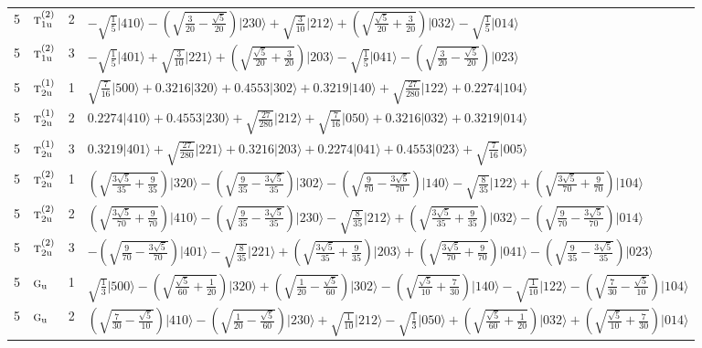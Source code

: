 \documentclass[11pt]{article}
\newcommand{\irr}[1]{\text{\normalfont\scshape #1}}
\newcommand{\ptag}[1]{\mathrm{#1}}
\newcommand{\occ}[1]{\lvert #1\rangle}
\begin{document}
\begin{longtable}{c l c p{}}
5 & $\irr{t}_{1\ptag{u}}^{(2)}$ & 2 & $-\sqrt{\tfrac{1}{5}}\occ{410}-(\sqrt{\frac{3}{20} - \frac{\sqrt{5}}{20}})\occ{230}+\sqrt{\tfrac{3}{10}}\occ{212}+(\sqrt{\frac{\sqrt{5}}{20} + \frac{3}{20}})\occ{032}-\sqrt{\tfrac{1}{5}}\occ{014}$\\
5 & $\irr{t}_{1\ptag{u}}^{(2)}$ & 3 & $-\sqrt{\tfrac{1}{5}}\occ{401}+\sqrt{\tfrac{3}{10}}\occ{221}+(\sqrt{\frac{\sqrt{5}}{20} + \frac{3}{20}})\occ{203}-\sqrt{\tfrac{1}{5}}\occ{041}-(\sqrt{\frac{3}{20} - \frac{\sqrt{5}}{20}})\occ{023}$\\
5 & $\irr{t}_{2\ptag{u}}^{(1)}$ & 1 & $\sqrt{\tfrac{7}{16}}\occ{500}+0.3216\occ{320}+0.4553\occ{302}+0.3219\occ{140}+\sqrt{\tfrac{27}{280}}\occ{122}+0.2274\occ{104}$\\
5 & $\irr{t}_{2\ptag{u}}^{(1)}$ & 2 & $0.2274\occ{410}+0.4553\occ{230}+\sqrt{\tfrac{27}{280}}\occ{212}+\sqrt{\tfrac{7}{16}}\occ{050}+0.3216\occ{032}+0.3219\occ{014}$\\
5 & $\irr{t}_{2\ptag{u}}^{(1)}$ & 3 & $0.3219\occ{401}+\sqrt{\tfrac{27}{280}}\occ{221}+0.3216\occ{203}+0.2274\occ{041}+0.4553\occ{023}+\sqrt{\tfrac{7}{16}}\occ{005}$\\
5 & $\irr{t}_{2\ptag{u}}^{(2)}$ & 1 & $(\sqrt{\frac{3 \sqrt{5}}{35} + \frac{9}{35}})\occ{320}-(\sqrt{\frac{9}{35} - \frac{3 \sqrt{5}}{35}})\occ{302}-(\sqrt{\frac{9}{70} - \frac{3 \sqrt{5}}{70}})\occ{140}-\sqrt{\tfrac{8}{35}}\occ{122}+(\sqrt{\frac{3 \sqrt{5}}{70} + \frac{9}{70}})\occ{104}$\\
5 & $\irr{t}_{2\ptag{u}}^{(2)}$ & 2 & $(\sqrt{\frac{3 \sqrt{5}}{70} + \frac{9}{70}})\occ{410}-(\sqrt{\frac{9}{35} - \frac{3 \sqrt{5}}{35}})\occ{230}-\sqrt{\tfrac{8}{35}}\occ{212}+(\sqrt{\frac{3 \sqrt{5}}{35} + \frac{9}{35}})\occ{032}-(\sqrt{\frac{9}{70} - \frac{3 \sqrt{5}}{70}})\occ{014}$\\
5 & $\irr{t}_{2\ptag{u}}^{(2)}$ & 3 & $-(\sqrt{\frac{9}{70} - \frac{3 \sqrt{5}}{70}})\occ{401}-\sqrt{\tfrac{8}{35}}\occ{221}+(\sqrt{\frac{3 \sqrt{5}}{35} + \frac{9}{35}})\occ{203}+(\sqrt{\frac{3 \sqrt{5}}{70} + \frac{9}{70}})\occ{041}-(\sqrt{\frac{9}{35} - \frac{3 \sqrt{5}}{35}})\occ{023}$\\
5 & $\irr{g}_{\ptag{u}}$ & 1 & $\sqrt{\tfrac{1}{3}}\occ{500}-(\sqrt{\frac{\sqrt{5}}{60} + \frac{1}{20}})\occ{320}+(\sqrt{\frac{1}{20} - \frac{\sqrt{5}}{60}})\occ{302}-(\sqrt{\frac{\sqrt{5}}{10} + \frac{7}{30}})\occ{140}-\sqrt{\tfrac{1}{10}}\occ{122}-(\sqrt{\frac{7}{30} - \frac{\sqrt{5}}{10}})\occ{104}$\\
5 & $\irr{g}_{\ptag{u}}$ & 2 & $(\sqrt{\frac{7}{30} - \frac{\sqrt{5}}{10}})\occ{410}-(\sqrt{\frac{1}{20} - \frac{\sqrt{5}}{60}})\occ{230}+\sqrt{\tfrac{1}{10}}\occ{212}-\sqrt{\tfrac{1}{3}}\occ{050}+(\sqrt{\frac{\sqrt{5}}{60} + \frac{1}{20}})\occ{032}+(\sqrt{\frac{\sqrt{5}}{10} + \frac{7}{30}})\occ{014}$\\

\end{longtable}
\end{document}
